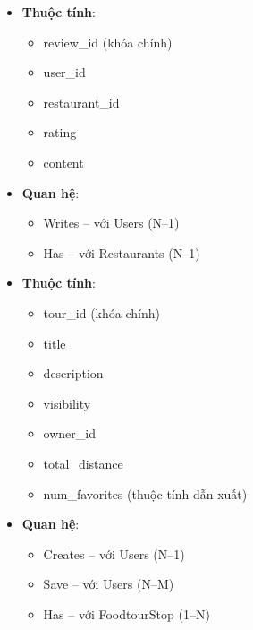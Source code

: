 \begin{itemize}[label=\textbullet]
    \item \textbf{Thuộc tính}:
    \begin{itemize}
        \item review\_id (khóa chính)
        \item user\_id
        \item restaurant\_id
        \item rating
        \item content
    \end{itemize}
    \item \textbf{Quan hệ}:
    \begin{itemize}
        \item Writes – với Users (N--1)
        \item Has – với Restaurants (N--1)
    \end{itemize}
\end{itemize}

\begin{itemize}[label=\textbullet]
    \item \textbf{Thuộc tính}:
    \begin{itemize}
        \item tour\_id (khóa chính)
        \item title
        \item description
        \item visibility
        \item owner\_id
        \item total\_distance
        \item num\_favorites (thuộc tính dẫn xuất)
    \end{itemize}
    \item \textbf{Quan hệ}:
    \begin{itemize}
        \item Creates – với Users (N--1)
        \item Save – với Users (N--M)
        \item Has – với FoodtourStop (1--N)
    \end{itemize}
\end{itemize}

